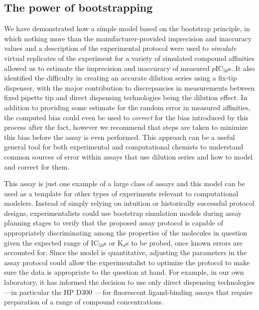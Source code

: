 \documentclass[aps,pre,twocolumn,nofootinbib,superscriptaddress,linenumbers]{revtex4-1}
\begin{document}
\subsection*{The power of bootstrapping}

We have demonstrated how a simple model based on the bootstrap principle, in which nothing more than the manufacturer-provided imprecision and inaccuracy values and a description of the experimental protocol were used to \emph{simulate} virtual replicates of the experiment for a variety of simulated compound affinities allowed us to estimate the imprecision and inaccuracy of measured $p$IC$_{50}$s.
It also identified the difficulty in creating an accurate dilution series using a fix-tip dispenser, with the major contribution to discrepancies in measurements between fixed pipette tip and direct dispensing technologies being the dilution effect. 
In addition to providing some estimate for the random error in measured affinities, the computed bias could even be used to \emph{correct} for the bias introduced by this process after the fact, however we recommend that steps are taken to minimize this bias before the assay is even performed. 
This approach can be a useful general tool for both experimental and computational chemists to understand common sources of error within assays that use dilution series and how to model and correct for them.

This assay is just one example of a large class of assays and this model can be used as a template for other types of experiments relevant to computational modelers.
Instead of simply relying on intuition or historically successful protocol designs, experimentalists could use bootstrap simulation models during assay planning stages to verify that the proposed assay protocol is capable of appropriately discriminating among the properties of the molecules in question given the expected range of IC$_{ 50}$s or K$_{d}$s to be probed, once known errors are accounted for.
Since the model is quantitative, adjusting the parameters in the assay protocol could allow the experimentalist to optimize the protocol to make sure the data is appropriate to the question at hand. 
For example, in our own laboratory, it has informed the decision to use only direct dispensing technologies---in particular the HP D300~\cite{jones_alternative_2013}---for fluorescent ligand-binding assays that require preparation of a range of compound concentrations.
\end{document}
